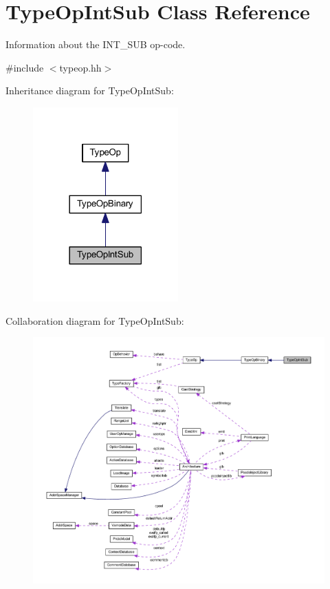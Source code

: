 \hypertarget{class_type_op_int_sub}{}\section{Type\+Op\+Int\+Sub Class Reference}
\label{class_type_op_int_sub}


Information about the I\+N\+T\+\_\+\+S\+UB op-\/code.  




{\ttfamily \#include $<$typeop.\+hh$>$}



Inheritance diagram for Type\+Op\+Int\+Sub\+:
\nopagebreak
\begin{figure}[H]
\begin{center}
\leavevmode
\includegraphics[width=158pt]{class_type_op_int_sub__inherit__graph}
\end{center}
\end{figure}


Collaboration diagram for Type\+Op\+Int\+Sub\+:
\nopagebreak
\begin{figure}[H]
\begin{center}
\leavevmode
\includegraphics[width=350pt]{class_type_op_int_sub__coll__graph}
\end{center}
\end{figure}
